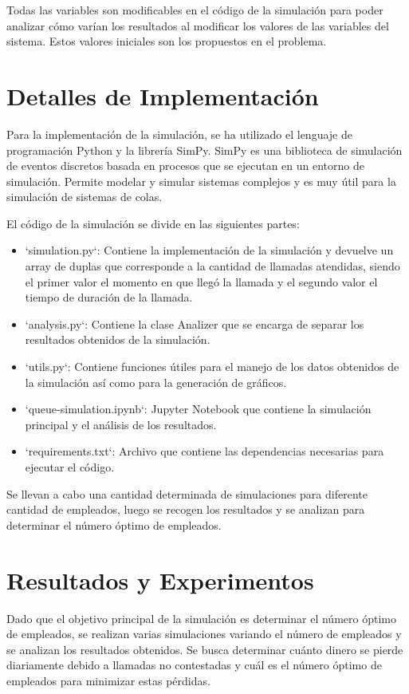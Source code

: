 \documentclass{article}
\begin{document}
Todas las variables son modificables en el código de la simulación para poder analizar cómo varían los resultados al modificar los valores de las variables del sistema. Estos valores iniciales son los propuestos en el problema.
\section{Detalles de Implementación}

Para la implementación de la simulación, se ha utilizado el lenguaje de programación Python y la librería SimPy. SimPy es una biblioteca de simulación de eventos discretos basada en procesos que se ejecutan en un entorno de simulación. Permite modelar y simular sistemas complejos y es muy útil para la simulación de sistemas de colas.

El código de la simulación se divide en las siguientes partes:
\begin{itemize}
    \item `simulation.py`: Contiene la implementación de la simulación y devuelve un array de duplas que corresponde a la cantidad de llamadas atendidas, siendo el primer valor el momento en que llegó la llamada y el segundo valor el tiempo de duración de la llamada.
    \item `analysis.py`: Contiene la clase Analizer que se encarga de separar los resultados obtenidos de la simulación.
    \item `utils.py`: Contiene funciones útiles para el manejo de los datos obtenidos de la simulación así como para la generación de gráficos.
    \item `queue-simulation.ipynb`: Jupyter Notebook que contiene la simulación principal y el análisis de los resultados.
    \item `requirements.txt`: Archivo que contiene las dependencias necesarias para ejecutar el código.
\end{itemize}

Se llevan a cabo una cantidad determinada de simulaciones para diferente cantidad de empleados, luego se recogen los resultados y se analizan para determinar el número óptimo de empleados.

\section{Resultados y Experimentos}
Dado que el objetivo principal de la simulación es determinar el número óptimo de empleados, se realizan varias simulaciones variando el número de empleados y se analizan los resultados obtenidos. Se busca determinar cuánto dinero se pierde diariamente debido a llamadas no contestadas y cuál es el número óptimo de empleados para minimizar estas pérdidas.
\end{document}
